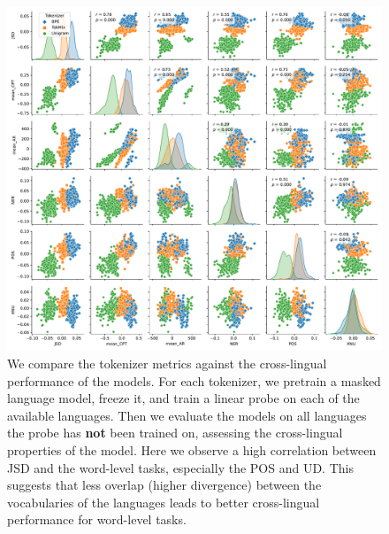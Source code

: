 \begin{figure}
    \centering
    \includegraphics[width=\textwidth]{figures/X_pair_analysis_20L.pdf}
    \caption{We compare the tokenizer metrics against the cross-lingual performance of the models. For each tokenizer, we pretrain a masked language model, freeze it, and train a linear probe on each of the available languages. Then we evaluate the models on all languages the probe has \textbf{not} been trained on, assessing the cross-lingual properties of the model. Here we observe a high correlation between JSD and the word-level tasks, especially the POS and UD. This suggests that less overlap (higher divergence) between the vocabularies of the languages leads to better cross-lingual performance for word-level tasks.} 
    \label{fig:X_pair_analysis_20L}
\end{figure}





